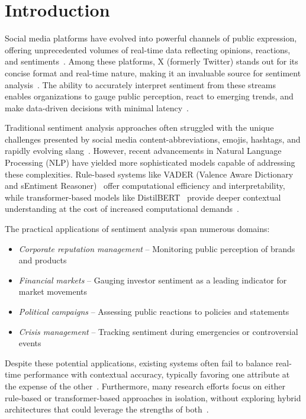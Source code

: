 \documentclass[conference]{IEEEtran}
\begin{document}
\section{Introduction}
Social media platforms have evolved into powerful channels of public expression, offering unprecedented volumes of real-time data reflecting opinions, reactions, and sentiments~\cite{birjali2021web, zhang2023sa, rodriquez2023sa}. Among these platforms, X (formerly Twitter) stands out for its concise format and real-time nature, making it an invaluable source for sentiment analysis~\cite{elalaoui2018twitter, hasselgren2023sp500}. The ability to accurately interpret sentiment from these streams enables organizations to gauge public perception, react to emerging trends, and make data-driven decisions with minimal latency~\cite{ilk2022sm}.

Traditional sentiment analysis approaches often struggled with the unique challenges presented by social media content-abbreviations, emojis, hashtags, and rapidly evolving slang~\cite{rahman2024roberta}. However, recent advancements in Natural Language Processing (NLP) have yielded more sophisticated models capable of addressing these complexities. Rule-based systems like VADER (Valence Aware Dictionary and sEntiment Reasoner)~\cite{hutto2014vader} offer computational efficiency and interpretability, while transformer-based models like DistilBERT~\cite{sanh2019distilbert} provide deeper contextual understanding at the cost of increased computational demands~\cite{rahman2024roberta}.

The practical applications of sentiment analysis span numerous domains:
\begin{itemize}
    \item \textit{Corporate reputation management} -- Monitoring public perception of brands and products~\cite{hasselgren2023sp500}
    \item \textit{Financial markets} -- Gauging investor sentiment as a leading indicator for market movements~\cite{hasselgren2023sp500}
    \item \textit{Political campaigns} -- Assessing public reactions to policies and statements~\cite{elalaoui2018twitter}
    \item \textit{Crisis management} -- Tracking sentiment during emergencies or controversial events~\cite{elalaoui2018twitter}
\end{itemize}

Despite these potential applications, existing systems often fail to balance real-time performance with contextual accuracy, typically favoring one attribute at the expense of the other~\cite{rahman2024roberta}. Furthermore, many research efforts focus on either rule-based or transformer-based approaches in isolation, without exploring hybrid architectures that could leverage the strengths of both~\cite{rahman2024roberta}.
\end{document}
